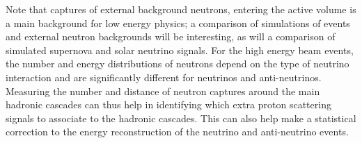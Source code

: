 Note that captures of external background neutrons, entering the active volume is a main background for low energy physics; a comparison of simulations of  events and external neutron backgrounds will be interesting, as will a comparison of simulated supernova and solar neutrino signals. For the high energy beam events, the number and energy distributions of neutrons depend on the type of neutrino interaction and are significantly different for neutrinos and anti-neutrinos. Measuring the number and distance of neutron captures around the main hadronic cascades can thus help in identifying which extra proton scattering signals to associate to the hadronic cascades. This can also help make a statistical correction to the energy reconstruction of the neutrino and anti-neutrino events.




